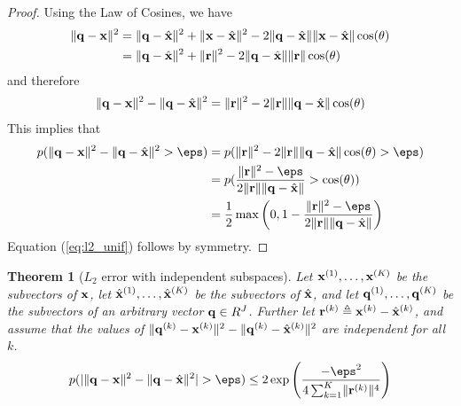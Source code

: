 \documentclass[]{article}
\newtheorem{theorem}{Theorem}[section]
\begin{document}
\begin{proof}
Using the Law of Cosines, we have
\begin{align}
    \lVert\mathbf{q} - \mathbf{x}\rVert^2 &= \lVert\mathbf{q} - \hat{\mathbf{x}}\rVert^2 + \lVert\mathbf{x} - \hat{\mathbf{x}}\rVert^2 - 2\lVert\mathbf{q} - \hat{\mathbf{x}}\rVert\lVert\mathbf{x} - \hat{\mathbf{x}}\rVert\cos(\theta) \nonumber \\
    & = \lVert\mathbf{q} - \hat{\mathbf{x}}\rVert^2 + \lVert\mathbf{r}\rVert^2 - 2\lVert\mathbf{q} - \hat{\mathbf{x}}\rVert\lVert\mathbf{r}\rVert\cos(\theta)
\end{align}
and therefore
\begin{align} \label{eq:l2_diff_cos}
    \lVert\mathbf{q} - \mathbf{x}\rVert^2 - \lVert\mathbf{q} - \hat{\mathbf{x}}\rVert^2 = \lVert\mathbf{r}\rVert^2 - 2\lVert\mathbf{r}\rVert\lVert\mathbf{q} - \hat{\mathbf{x}}\rVert\cos(\theta)
\end{align}
This implies that
\begin{align}
    p(\norm{\q - \x}^2 - \norm{\q - \xhat}^2 > \eps) &= p(\norm{\r}^2 - 2\norm{\r}\norm{\q - \xhat}\cos(\theta) > \eps) \nonumber \\
    &= p(\frac{\norm{\r}^2 - \eps }{ 2\norm{\r}\norm{\q - \xhat} } > \cos(\theta)) \nonumber \\
    &= \onehalf \max \left( 0, 1 - \frac{\norm{\r}^2 - \eps }{ 2\norm{\r}\norm{\q - \xhat} } \right)
\end{align}
Equation (\ref{eq:l2_unif}) follows by symmetry.

\end{proof}


\begin{theorem}[$L_2$ error with independent subspaces] \label{thm:l2_indep}
Let $\mathbf{x}^{(1)},\ldots,\mathbf{x}^{(K)}$ be the subvectors of $\mathbf{x}$, let $\hat{\mathbf{x}}^{(1)},\ldots,\hat{\mathbf{x}}^{(K)}$ be the subvectors of $\hat{\mathbf{x}}$, and let $\mathbf{q}^{(1)},\ldots,\mathbf{q}^{(K)}$ be the subvectors of an arbitrary vector $\mathbf{q} \in R^J$. Further let $\mathbf{r}^{(k)} \triangleq \mathbf{x}^{(k)} - \hat{\mathbf{x}}^{(k)}$, and assume that the values of $\lVert\mathbf{q}^{(k)} - \mathbf{x}^{(k)} \rVert^2 - \lVert\mathbf{q}^{(k)} - \hat{\mathbf{x}}^{(k)} \rVert^2$ are independent for all $k$. %
\begin{align} \label{eq:l2_indep}
    p(\abs{ \norm{\q - \x}^2 - \norm{\q - \xhat}^2 } > \eps) \le
        2\exp \left( \frac{-\eps^2}{
            4 \sum_{k=1}^K \norm{\r^{(k)}}^4
        }\right)
\end{align}
\end{theorem}
\end{document}
